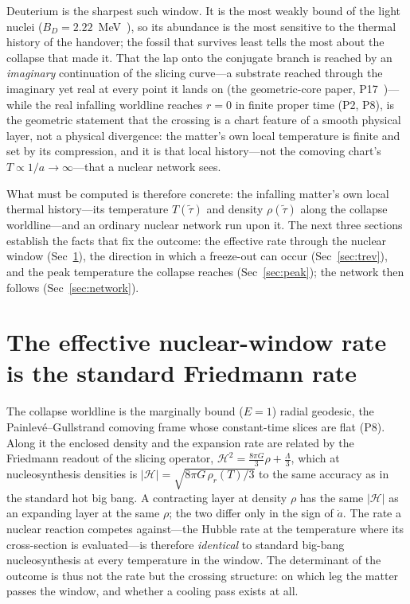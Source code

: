 \documentclass[11pt,a4paper]{article}
\theoremstyle{plain}
\theoremstyle{definition}
\theoremstyle{remark}
\begin{document}
Deuterium is the sharpest such window. It is the most weakly bound of the light nuclei
($B_D=2.22$~MeV~\cite{AME2020}), so its abundance is the most sensitive to the thermal history of the handover;
the fossil that survives least tells the most about the collapse that made it. That the lap onto
the conjugate branch is reached by an \emph{imaginary} continuation of the slicing curve---a
substrate reached through the imaginary yet real at every point it lands on (the geometric-core
paper, P17~\cite{JanzenGeometricCore})---while
the real infalling worldline reaches $r=0$ in finite proper time (P2, P8), is the geometric
statement that the crossing is a chart feature of a smooth physical layer, not a physical
divergence: the matter's own local temperature is finite and set by its compression, and it is
that local history---not the comoving chart's $T\propto1/a\to\infty$---that a nuclear network
sees.

What must be computed is therefore concrete: the infalling matter's own local thermal
history---its temperature $T(\tilde\tau)$ and density $\rho(\tilde\tau)$ along the collapse
worldline---and an ordinary nuclear network run upon it. The next three sections establish the
facts that fix the outcome: the effective rate through the nuclear window
(Sec~\ref{sec:rate}), the direction in which a freeze-out can occur (Sec~\ref{sec:trev}), and
the peak temperature the collapse reaches (Sec~\ref{sec:peak}); the network then follows
(Sec~\ref{sec:network}).

\section{The effective nuclear-window rate is the standard Friedmann rate}\label{sec:rate}
The collapse worldline is the marginally bound ($E=1$) radial geodesic, the
Painlev\'e--Gullstrand comoving frame whose constant-time slices are flat (P8). Along it the
enclosed density and the expansion rate are related by the Friedmann readout of the slicing
operator, $\mathcal H^2=\tfrac{8\pi G}{3}\rho+\tfrac{\Lambda}{3}$, which at nucleosynthesis
densities is $|\mathcal H|=\sqrt{8\pi G\,\rho_r(T)/3}$ to the same accuracy as in the standard
hot big bang. A contracting layer at density $\rho$ has the same $|\mathcal H|$ as an expanding
layer at the same $\rho$; the two differ only in the sign of $\dot a$. The rate a nuclear
reaction competes against---the Hubble rate at the temperature where its cross-section is
evaluated---is therefore \emph{identical} to standard big-bang nucleosynthesis at every
temperature in the window. The determinant of the outcome is thus not the rate but the crossing
structure: on which leg the matter passes the window, and whether a cooling pass exists at all.
\end{document}
